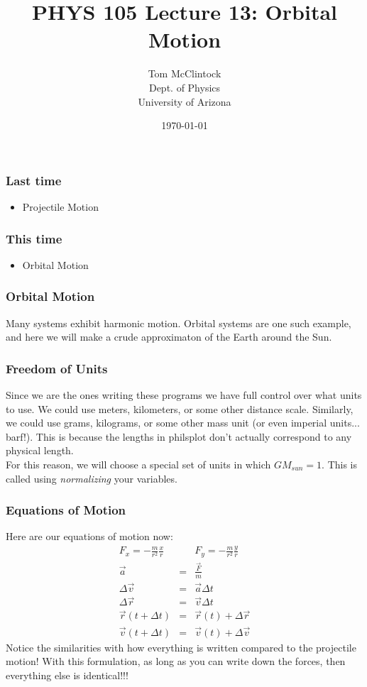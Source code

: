 \documentclass{beamer}
\title{PHYS 105 Lecture 13: Orbital Motion}
\author{Tom McClintock \\
	Dept. of Physics\\
	University of Arizona
}
\date{\today}
\begin{document}
\begin{frame}
  \titlepage
\end{frame}

\begin{frame}
  \frametitle{Last time}
  \begin{itemize}
    \item Projectile Motion
  \end{itemize}
\end{frame}

\begin{frame}
  \frametitle{This time}
  \begin{itemize}
    \item Orbital Motion
  \end{itemize}
\end{frame}

\begin{frame}
  \frametitle{Orbital Motion}
  Many systems exhibit harmonic motion. Orbital systems
  are one such example, and here we will make a crude
  approximaton of the Earth around the Sun.
\end{frame}

\begin{frame}
  \frametitle{Freedom of Units}
  Since we are the ones writing these programs we have
  full control over what units to use. We could use meters,
  kilometers, or some other distance scale. Similarly, we could
  use grams, kilograms, or some other mass unit (or even
  imperial units... barf!). This is because the lengths
  in philsplot don't actually correspond to any physical length.\\
  For this reason, we will choose a special set of units in which
  $GM_{sun}=1$. This is called using \textit{normalizing} your variables.
\end{frame}

\begin{frame}
  \frametitle{Equations of Motion}
  Here are our equations of motion now:
  \begin{eqnarray*}
    F_x = -\frac{m}{r^2}\frac{x}{r} && F_y = -\frac{m}{r^2}\frac{y}{r}\\
    \vec{a} &=& \frac{\vec{F}}{m}\\
    \Delta\vec{v} &=& \vec{a}\Delta t\\
    \Delta\vec{r} &=& \vec{v}\Delta t\\
    \vec{r}(t+\Delta t) &=& \vec{r}(t) + \Delta\vec{r}\\
    \vec{v}(t+\Delta t) &=& \vec{v}(t) + \Delta\vec{v}
  \end{eqnarray*}
  Notice the similarities with how everything is written compared to the
  projectile motion! With this formulation, as long as you can write
  down the forces, then everything else is identical!!!
\end{frame}
\end{document}
